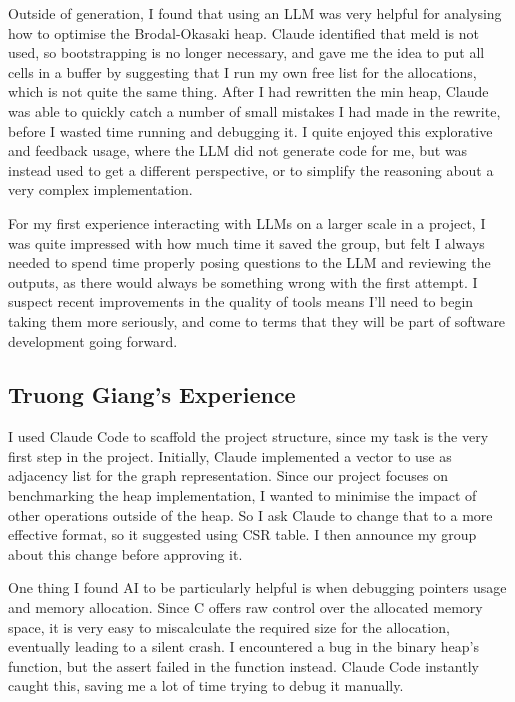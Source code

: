 Outside of generation, I found that using an LLM was very helpful for analysing
how to optimise the Brodal-Okasaki heap. Claude identified that meld is not
used, so bootstrapping is no longer necessary, and gave me the idea to put all
cells in a buffer by suggesting that I run my own free list for the allocations,
which is not quite the same thing. After I had rewritten the min heap, Claude
was able to quickly catch a number of small mistakes I had made in the rewrite,
before I wasted time running and debugging it. I quite enjoyed this explorative
and feedback usage, where the LLM did not generate code for me, but was instead
used to get a different perspective, or to simplify the reasoning about a very
complex implementation.

For my first experience interacting with LLMs on a larger scale in a project, I
was quite impressed with how much time it saved the group, but felt I always
needed to spend time properly posing questions to the LLM and reviewing the
outputs, as there would always be something wrong with the first attempt. I
suspect recent improvements in the quality of tools means I'll need to begin
taking them more seriously, and come to terms that they will be part of software
development going forward.

\subsection{Truong Giang's Experience}

I used Claude Code to scaffold the project structure, since my task is the very
first step in the project. Initially, Claude implemented a vector to use as
adjacency list for the graph representation. Since our project focuses on
benchmarking the heap implementation, I wanted to minimise the impact of other
operations outside of the heap. So I ask Claude to change that to a more
effective format, so it suggested using CSR table. I then announce my group
about this change before approving it.

One thing I found AI to be particularly helpful is when debugging pointers usage
and memory allocation. Since C offers raw control over the allocated memory
space, it is very easy to miscalculate the required size for the allocation,
eventually leading to a silent crash. I encountered a bug in the binary heap's
 function, but the assert failed in the 
function instead. Claude Code instantly caught this, saving me a lot of time
trying to debug it manually.

